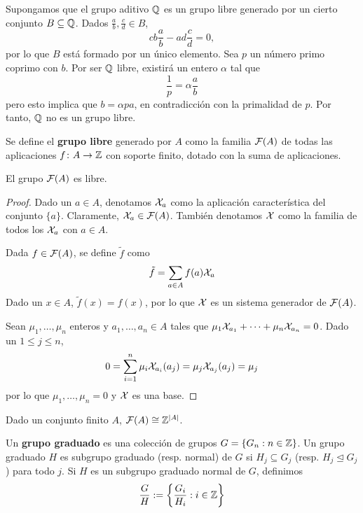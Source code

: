 \begin{example}
	Supongamos que el grupo aditivo $\mathbb{Q}$ es un grupo libre generado por un cierto conjunto $B \subseteq \mathbb{Q}$.
	Dados $\frac{a}{b}, \frac{c}{d} \in B$,
		\[cb\frac{a}{b}-ad\frac{c}{d}=0,\]
	por lo que $B$ está formado por un único elemento.
	Sea $p$ un número primo coprimo con $b$.
	Por ser $\mathbb{Q}$ libre, existirá un entero $\alpha$ tal que
		\[\frac{1}{p}=\alpha\frac{a}{b}\]
	pero esto implica que $b=\alpha pa$, en contradicción con la primalidad de $p$.
	Por tanto, $\mathbb{Q}$ no es un grupo libre.
\end{example}


Se define el \textbf{grupo libre} generado por $A$ como la familia $\mathcal{F}(A)$ de todas las aplicaciones $f\colon A \to \mathbb{Z}$ con soporte finito, dotado con la suma de aplicaciones.

\begin{proposition}
	El grupo $\mathcal{F}(A)$ es libre.
\end{proposition}

\begin{proof}
	Dado un $a \in A$, denotamos $\mathcal{X}_a$ como la aplicación característica del conjunto $\{a\}$.
	Claramente, $\mathcal{X}_a \in \mathcal{F}(A)$.
	También denotamos $\mathcal{X}$ como la familia de todos los $\mathcal{X}_a$ con $a \in A$.

	Dada $f \in \mathcal{F}(A)$, se define $\tilde{f}$ como
		\[\tilde{f}=\sum_{a \in A}f(a)\mathcal{X}_a\]
	Dado un $x \in A$, $\tilde f(x)=f(x)$, por lo que $\mathcal{X}$ es un sistema generador de $\mathcal{F}(A)$.
	
	Sean $\mu_1,\dots,\mu_n$ enteros y $a_1,\dots,a_n \in A$ tales que $\mu_1\mathcal{X}_{a_1}+\dots+\mu_n\mathcal{X}_{a_n}=0$.
	Dado un $1 \leq j \leq n$,
		\[0=\sum^n_{i=1}\mu_i\mathcal{X}_{a_i}(a_j)=\mu_j\mathcal{X}_{a_j}(a_j)=\mu_j\]
	por lo que $\mu_1,\dots,\mu_n=0$ y $\mathcal{X}$ es una base.
\end{proof}

\begin{remark}
	Dado un conjunto finito $A$, $\mathcal{F}(A)\cong \mathbb{Z}^{|A|}$.
\end{remark}

\begin{definition}
	Un \textbf{grupo graduado} es una colección de grupos $G=\{G_n: n \in \mathbb{Z}\}$.
	Un grupo graduado $H$ es subgrupo graduado (resp. normal) de $G$ si $H_j \subseteq G_j$ (resp. $H_j \trianglelefteq G_j$) para todo $j$.
	Si $H$ es un subgrupo graduado normal de $G$, definimos
		\[\frac{G}{H}:=\left\{\frac{G_i}{H_i}: i \in \mathbb{Z}\right\}\]
\end{definition}

